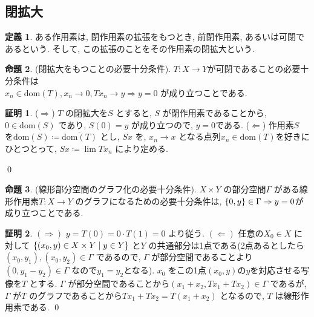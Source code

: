 \documentclass[10pt, fleqn, label-section=none]{bxjsarticle}
\theoremstyle{definition}
\newtheorem{dfn}{定義}[section]
\newtheorem{prop}[dfn]{命題}
\newtheorem*{pf*}{証明}
\newcommand{\cbra}[1]{\mleft\{#1\mright\}}
\newcommand{\naraba}{\Rightarrow}
\newcommand{\gyaku}{\Leftarrow}
\renewcommand{\;}{\, ; \,}
\newenvironment{claim}[1]{\par\noindent\underline{claim:}\space#1}{}
\newenvironment{claimproof}[1]{\par\noindent{($\because$)}\space#1}{\hfill $\blacktriangle $}
\begin{document}
\subsection{閉拡大}

\begin{dfn}
ある作用素は, 閉作用素の拡張をもつとき, 前閉作用素, あるいは可閉であるという. そして, この拡張のことをその作用素の閉拡大という. 
\end{dfn}

\begin{prop}(閉拡大をもつことの必要十分条件).
$T:X\rightarrow Y$が可閉であることの必要十分条件は\\
$x_n \in \textrm{dom}(T), x_n \rightarrow 0, Tx_n \rightarrow y \naraba y = 0$
が成り立つことである. 
\end{prop}
\begin{pf*}

($\naraba$)
$T$ の閉拡大を$S$ とすると, $S$ が閉作用素であることから, $0 \in \textrm{dom}(S)$ であり, $S(0) = y$ が成り立つので, $y = 0$である. 
($\gyaku$) 作用素$S$ を$\textrm{dom} (S) \coloneqq \overline{\textrm{dom} (T)} $ とし, $Sx$ を, $x_n \rightarrow x$ となる点列$x_n \in \textrm{dom} (T) $を好きにひとつとって, $Sx \coloneqq \lim T x_n$ により定める. 




\qed
\end{pf*}

\begin{prop}(線形部分空間のグラフ化の必要十分条件).
$X \times Y$ の部分空間$\Gamma$ がある線形作用素$T: X \rightarrow Y$ のグラフになるための必要十分条件は, $\cbra{0, y} \in \Gamma \naraba y =0 $が成り立つことである. 
\end{prop}
\begin{pf*}
$(\naraba)$ $y = T(0) = 0 \cdot T(1) = 0$ より従う. $(\gyaku)$ 任意の$X_0 \in X$ に対して $\cbra{(x_0 , y) \in X \times Y \mid y \in Y}$ と$Y$ の共通部分は1点である(2点あるとしたら$(x_0, y_1), (x_0, y_2) \in \Gamma$ であるので, $\Gamma$ が部分空間であることより$(0, y_1 - y_2) \in \Gamma$ なので$y_1 = y_2$となる). $x_0$ をこの1点$(x_0, y)$の$y$を対応させる写像を$T$ とする. $\Gamma$ が部分空間であることから$(x_1 + x_2 , Tx_1 + Tx_2) \in \Gamma$ であるが, $\Gamma$ が$T$ のグラフであることから$Tx_1 + Tx_2 = T(x_1 + x_2)$ となるので, $T$ は線形作用素である.    
\qed
\end{pf*}
\end{document}
